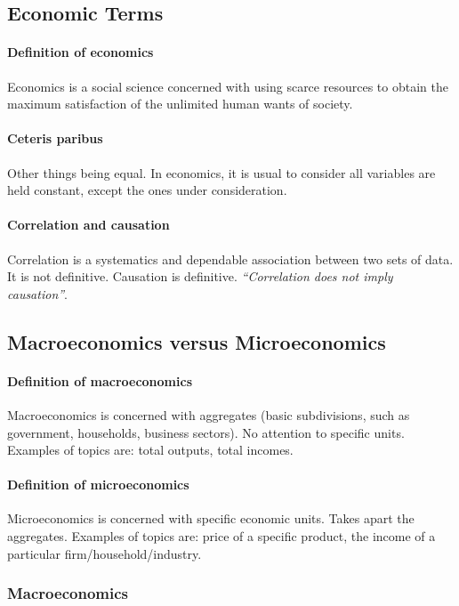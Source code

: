 \subsection{Economic Terms}

\paragraph{Definition of economics}
Economics is a social science concerned with using scarce resources to obtain the maximum satisfaction of the unlimited human wants of society.

\paragraph{Ceteris paribus}
Other things being equal. In economics, it is usual to consider all variables are held constant, except the ones under consideration.

\paragraph{Correlation and causation}
Correlation is a systematics and dependable association between two sets of data.
It is not definitive.
Causation is definitive. \emph{``Correlation does not imply causation''}.

\subsection{Macroeconomics versus Microeconomics}

\paragraph{Definition of macroeconomics} Macroeconomics is concerned with aggregates (basic subdivisions, such as government, households, business sectors). No attention to specific units.
Examples of topics are: total outputs, total incomes.

\paragraph{Definition of microeconomics}
Microeconomics is concerned with specific economic units. Takes apart the aggregates.
Examples of topics are: price of a specific product, the income of a particular firm/household/industry. 

\subsubsection{Macroeconomics}

